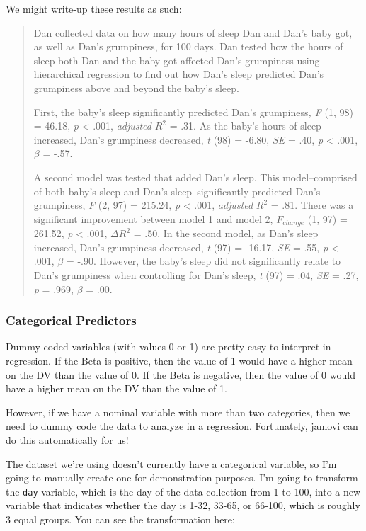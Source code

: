 \documentclass[
]{book}
\begin{document}
We might write-up these results as such:

\begin{quote}
Dan collected data on how many hours of sleep Dan and Dan's baby got, as well as Dan's grumpiness, for 100 days. Dan tested how the hours of sleep both Dan and the baby got affected Dan's grumpiness using hierarchical regression to find out how Dan's sleep predicted Dan's grumpiness above and beyond the baby's sleep.

First, the baby's sleep significantly predicted Dan's grumpiness\emph{, F} (1, 98) = 46.18, \emph{p} \textless{} .001, \emph{adjusted} \(R^2\) = .31. As the baby's hours of sleep increased, Dan's grumpiness decreased, \emph{t} (98) = -6.80, \emph{SE} = .40, \emph{p} \textless{} .001, \(\beta\) = -.57.

A second model was tested that added Dan's sleep. This model--comprised of both baby's sleep and Dan's sleep--significantly predicted Dan's grumpiness, \emph{F} (2, 97) = 215.24, \emph{p} \textless{} .001, \emph{adjusted} \(R^2\) = .81. There was a significant improvement between model 1 and model 2, \(F_{change}\) (1, 97) = 261.52, \emph{p} \textless{} .001, \(\Delta R^2\) = .50. In the second model, as Dan's sleep increased, Dan's grumpiness decreased, \emph{t} (97) = -16.17, \emph{SE} = .55, \emph{p} \textless{} .001, \(\beta\) = -.90. However, the baby's sleep did not significantly relate to Dan's grumpiness when controlling for Dan's sleep, \emph{t} (97) = .04, \emph{SE} = .27, \emph{p} = .969, \(\beta\) = .00.
\end{quote}

\hypertarget{categorical-predictors}{%
\subsubsection{Categorical Predictors}\label{categorical-predictors}}

Dummy coded variables (with values 0 or 1) are pretty easy to interpret in regression. If the Beta is positive, then the value of 1 would have a higher mean on the DV than the value of 0. If the Beta is negative, then the value of 0 would have a higher mean on the DV than the value of 1.

However, if we have a nominal variable with more than two categories, then we need to dummy code the data to analyze in a regression. Fortunately, jamovi can do this automatically for us!

The dataset we're using doesn't currently have a categorical variable, so I'm going to manually create one for demonstration purposes. I'm going to transform the \texttt{day} variable, which is the day of the data collection from 1 to 100, into a new variable that indicates whether the day is 1-32, 33-65, or 66-100, which is roughly 3 equal groups. You can see the transformation here:
\end{document}
